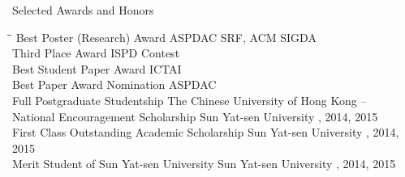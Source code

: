 
\begin{rSection}{Selected Awards and Honors}
\begin{tabbing}
\hspace{3.2in}\= \hspace{2.8in}\=\kill
    Best Poster (Research) Award      \> ASPDAC SRF, ACM SIGDA        \\

    Third Place Award                 \> ISPD Contest        \\

    Best Student Paper Award                     \>ICTAI                         \\   

    Best Paper Award Nomination                  \>ASPDAC                         \\  

    Full Postgraduate Studentship                \>The Chinese University of Hong Kong                       --    \\

    National Encouragement Scholarship      \> Sun Yat-sen University     , 2014, 2015 \\

    First Class Outstanding Academic Scholarship             \> Sun Yat-sen University     , 2014, 2015 \\

    Merit Student of Sun Yat-sen University                   \> Sun Yat-sen University     , 2014, 2015 \\
\end{tabbing}
\end{rSection}

